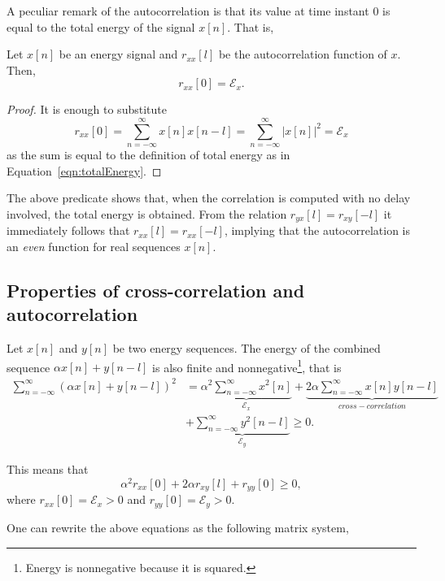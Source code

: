 \documentclass[\documentfontsize, twocolumn]{\classname}
\begin{document}
A peculiar remark of the autocorrelation is that its value at time instant $0$ is equal to the total energy of the signal $x[n]$. That is,

\begin{predicate}
    Let $x[n]$ be an energy signal and $r_{xx}[l]$ be the autocorrelation function of $x$. Then,
    \begin{equation}\label{eqn:equivalenceAutocorrelationEnergy}
        r_{xx}[0] = \mathcal E_x.
    \end{equation}
\end{predicate}

\begin{proof}
    It is enough to substitute
    \[
        r_{xx}[0] = \sum_{n=-\infty}^\infty x[n]x[n-l] =\sum_{n=-\infty}^\infty |x[n]|^2 = \mathcal E_x
    \]
    as the sum is equal to the definition of total energy as in Equation~\ref{eqn:totalEnergy}.
\end{proof}

The above predicate shows that, when the correlation is computed with no delay involved, the total energy is obtained. From the relation $r_{yx}[l] = r_{xy}[-l]$ it immediately follows that $r_{xx}[l] = r_{xx}[-l]$, implying that the autocorrelation is an \emph{even} function for real sequences $x[n]$.

\subsection{Properties of cross-correlation and autocorrelation}
Let $x[n]$ and $y[n]$ be two energy sequences. The energy of the combined sequence $\alpha x[n] + y[n-l]$ is also finite and nonnegative\footnote{Energy is nonnegative because it is squared.}, that is
\begin{align*}
    \sum_{n=-\infty}^\infty (\alpha x[n] + y[n-l])^2 &= \underbrace{\alpha^2 \sum_{n=-\infty}^\infty x^2[n]}_{\mathcal E_x} + \underbrace{2\alpha \sum_{n=-\infty}^\infty x[n] y[n-l]}_{cross-correlation}\\ &+ \underbrace{\sum_{n=-\infty}^\infty y^2[n-l]}_{\mathcal E_y} \geq 0.
\end{align*}

This means that
\[
    \alpha^2 r_{xx}[0] + 2\alpha r_{xy}[l] + r_{yy}[0] \geq 0,
\]
where $r_{xx}[0] = \mathcal E_x > 0$ and $r_{yy}[0] = \mathcal E_y > 0$.

One can rewrite the above equations as the following matrix system,
\end{document}
